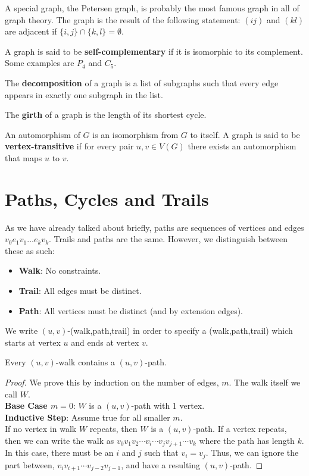 A special graph, the Petersen graph, is probably the most famous graph in all of graph theory. The graph is the result of  the following statement: $(ij)$ and $(kl)$ are adjacent if $\{i,j\} \cap \{k,l\} = \emptyset$.

A graph is said to be \textbf{self-complementary} if it is isomorphic to its complement. Some examples are $P_{4}$ and $C_{5}$.

The \textbf{decomposition} of a graph is a list of subgraphs such that every edge appears in exactly one subgraph in the list.

The \textbf{girth} of a graph is the length of its shortest cycle.

An automorphism of $G$ is an isomorphism from $G$ to itself. A graph is said to be \textbf{vertex-transitive} if for every pair $u, v \in V(G)$ there exists an automorphism that maps $u$ to $v$.

\section{Paths, Cycles and Trails}%
\label{sec:label}

As we have already talked about briefly, paths are sequences of vertices and edges $v_{0}e_{1}v_{1}\ldots e_{k}v_{k}$. Trails and paths are the same. However, we distinguish between these as such:
\begin{itemize}
	\item \textbf{Walk}: No constraints.
	\item \textbf{Trail}: All edges must be distinct.
	\item \textbf{Path}: All vertices must be distinct (and by extension edges).
\end{itemize}

We write $(u,v)$-(walk,path,trail) in order to specify a (walk,path,trail) which starts at vertex $u$ and ends at vertex $v$.

\begin{lemma}
	Every $(u,v)$-walk contains a $(u,v)$-path.
\end{lemma}

\begin{proof}
	We prove this by induction on the number of edges, $m$. The walk itself we call $W$.\\
	\noindent
	\textbf{Base Case $m = 0$}: $W$ is a $(u,v)$-path with 1 vertex.\\
	\noindent
	\textbf{Inductive Step}: Assume true for all smaller $m$.\\
	\noindent
	If no vertex in walk $W$ repeats, then $W$ is a $(u,v)$-path. If a vertex repeats, then we can write the walk as $v_{0}v_{1}v_{2} \cdots v_{i} \cdots v_{j}v_{j+1} \cdots v_{k}$ where the path has length $k$. In this case, there must be an $i$ and $j$ such that $v_{i} = v_{j}$. Thus, we can ignore the part between, $v_{i}v_{i+1} \cdots v_{j-2}v_{j-1}$, and have a resulting $(u,v)$-path.
\end{proof}

